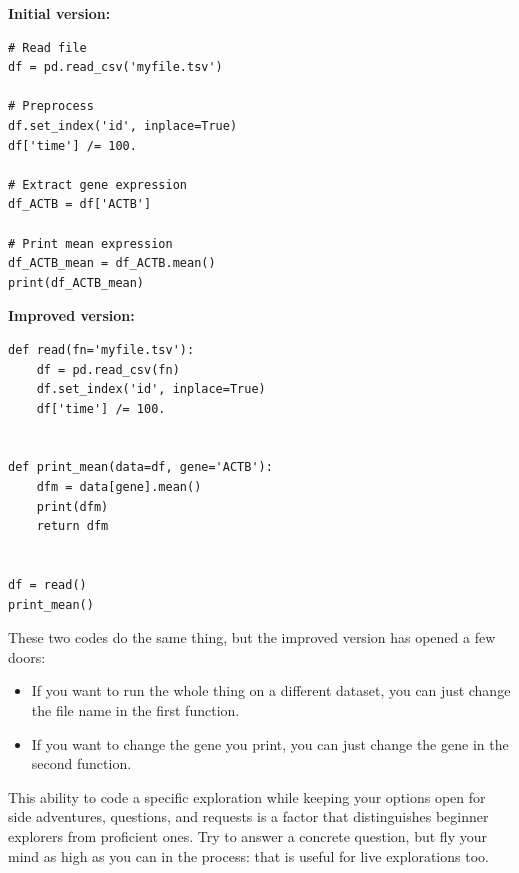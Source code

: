 \documentclass[12pt,a4paper,notitlepage,onecolumn]{article}
\begin{document}
\begin{multicols}{2}[]
\textbf{Initial version:}

\begin{verbatim}
# Read file
df = pd.read_csv('myfile.tsv')

# Preprocess
df.set_index('id', inplace=True)
df['time'] /= 100.

# Extract gene expression
df_ACTB = df['ACTB']

# Print mean expression
df_ACTB_mean = df_ACTB.mean()
print(df_ACTB_mean)

\end{verbatim}

\textbf{Improved version:}

\begin{verbatim}
def read(fn='myfile.tsv'):
    df = pd.read_csv(fn)
    df.set_index('id', inplace=True)
    df['time'] /= 100.


def print_mean(data=df, gene='ACTB'):
    dfm = data[gene].mean()
    print(dfm)
    return dfm


df = read()
print_mean()
\end{verbatim}
\end{multicols}

These two codes do the same thing, but the improved version has opened a few doors:
\begin{itemize}
\item If you want to run the whole thing on a different dataset, you can just change the file name in the first function.
\item If you want to change the gene you print, you can just change the gene in the second function.
\end{itemize}

This ability to code a specific exploration while keeping your options open for side adventures, questions, and requests is a factor that distinguishes beginner explorers from proficient ones. Try to answer a concrete question, but fly your mind as high as you can in the process: that is useful for live explorations too.
\end{document}
